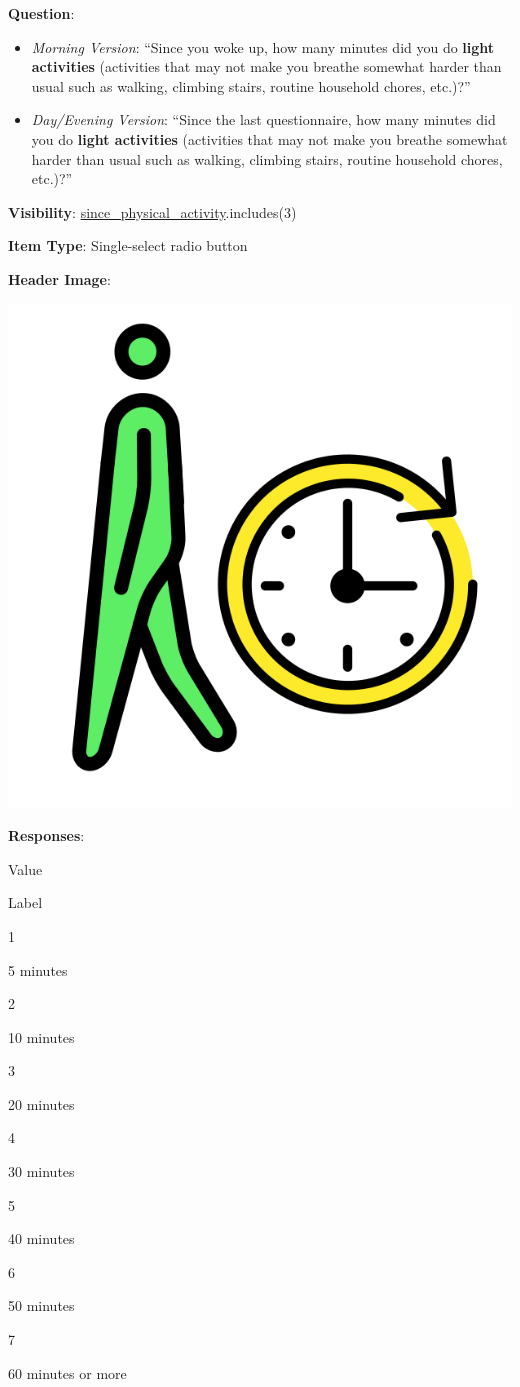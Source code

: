\documentclass[]{book}
\providecommand{\tightlist}{%
  \setlength{\itemsep}{0pt}\setlength{\parskip}{0pt}}
\begin{document}
\textbf{Question}:

\begin{itemize}
\tightlist
\item
  \emph{Morning Version}: ``Since you woke up, how many minutes did you do \textbf{light activities} (activities that may not make you breathe somewhat harder than usual such as walking, climbing stairs, routine household chores, etc.)?''
\item
  \emph{Day/Evening Version}: ``Since the last questionnaire, how many minutes did you do \textbf{light activities} (activities that may not make you breathe somewhat harder than usual such as walking, climbing stairs, routine household chores, etc.)?''
\end{itemize}

\textbf{Visibility}: \protect\hyperlink{since_physical_activity}{since\_physical\_activity}.includes(3)

\textbf{Item Type}: Single-select radio button

\textbf{Header Image}:

\begin{flushleft}\includegraphics[width=0.33\linewidth]{downloadFigs4latex_NIMH_Applet_Codebook/since_light_activity_headerImg} \end{flushleft}

\textbf{Responses}:

Value

Label

1

5 minutes

2

10 minutes

3

20 minutes

4

30 minutes

5

40 minutes

6

50 minutes

7

60 minutes or more
\end{document}
